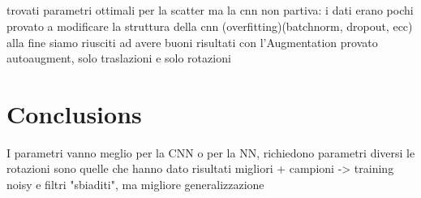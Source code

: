 \documentclass{report}
\begin{document}
\section{}
trovati parametri ottimali per la scatter
ma la cnn non partiva: i dati erano pochi
provato a modificare la struttura della cnn (overfitting)(batchnorm, dropout, ecc)
alla fine siamo riusciti ad avere buoni risultati con l'Augmentation
provato autoaugment, solo traslazioni e solo rotazioni

\chapter{Conclusions}
I parametri vanno meglio per la CNN o per la NN, richiedono parametri diversi
le rotazioni sono quelle che hanno dato risultati migliori
+ campioni -> training noisy e filtri "sbiaditi", ma migliore generalizzazione
\end{document}
